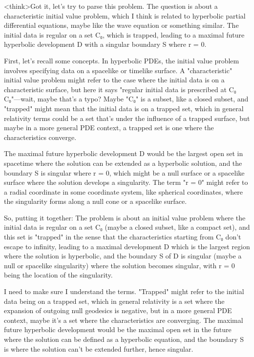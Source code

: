 <think>Got it, let's try to parse this problem. The question is about a characteristic initial value problem, which I think is related to hyperbolic partial differential equations, maybe like the wave equation or something similar. The initial data is regular on a set C₀, which is trapped, leading to a maximal future hyperbolic development D with a singular boundary S where r = 0. 

First, let's recall some concepts. In hyperbolic PDEs, the initial value problem involves specifying data on a spacelike or timelike surface. A "characteristic" initial value problem might refer to the case where the initial data is on a characteristic surface, but here it says "regular initial data is prescribed at C₀ C₀"—wait, maybe that's a typo? Maybe "C₀" is a subset, like a closed subset, and "trapped" might mean that the initial data is on a trapped set, which in general relativity terms could be a set that's under the influence of a trapped surface, but maybe in a more general PDE context, a trapped set is one where the characteristics converge. 

The maximal future hyperbolic development D would be the largest open set in spacetime where the solution can be extended as a hyperbolic solution, and the boundary S is singular where r = 0, which might be a null surface or a spacelike surface where the solution develops a singularity. The term "r = 0" might refer to a radial coordinate in some coordinate system, like spherical coordinates, where the singularity forms along a null cone or a spacelike surface. 

So, putting it together: The problem is about an initial value problem where the initial data is regular on a set C₀ (maybe a closed subset, like a compact set), and this set is "trapped" in the sense that the characteristics starting from C₀ don't escape to infinity, leading to a maximal development D which is the largest region where the solution is hyperbolic, and the boundary S of D is singular (maybe a null or spacelike singularity) where the solution becomes singular, with r = 0 being the location of the singularity. 

I need to make sure I understand the terms. "Trapped" might refer to the initial data being on a trapped set, which in general relativity is a set where the expansion of outgoing null geodesics is negative, but in a more general PDE context, maybe it's a set where the characteristics are converging. The maximal future hyperbolic development would be the maximal open set in the future where the solution can be defined as a hyperbolic equation, and the boundary S is where the solution can't be extended further, hence singular. 

